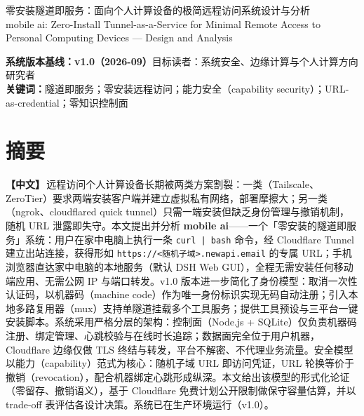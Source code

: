 \documentclass[10pt,a4paper]{article}
\newcommand{\sys}{mobile ai}
\begin{document}
\begin{center}
{\LARGE 零安装隧道即服务：面向个人计算设备的极简远程访问系统设计与分析\\[0.6em]}
{\large mobile ai: Zero-Install Tunnel-as-a-Service for Minimal Remote Access to Personal Computing Devices --- Design and Analysis}
\end{center}

\vspace{0.8em}
\noindent\textbf{系统版本基线：v1.0（2026-09）}\quad 目标读者：系统安全、边缘计算与个人计算方向研究者\\
\noindent\textbf{关键词：}隧道即服务；零安装远程访问；能力安全（capability security）；URL-as-credential；零知识控制面

\section*{摘要}

\noindent\textbf{【中文】}\,远程访问个人计算设备长期被两类方案割裂：一类（Tailscale、ZeroTier）要求两端安装客户端并建立虚拟私有网络，部署摩擦大；另一类（ngrok、cloudflared quick tunnel）只需一端安装但缺乏身份管理与撤销机制，随机 URL 泄露即失守。本文提出并分析 \textbf{\sys}——一个「零安装的隧道即服务」系统：用户在家中电脑上执行一条 \texttt{curl\ | bash} 命令，经 Cloudflare Tunnel 建立出站连接，获得形如 \texttt{https://<随机子域>.newapi.email} 的专属 URL；手机浏览器直达家中电脑的本地服务（默认 DSH Web GUI），全程无需安装任何移动端应用、无需公网 IP 与端口转发。v1.0 版本进一步简化了身份模型：取消一次性认证码，以机器码（machine code）作为唯一身份标识实现无码自动注册；引入本地多路复用器（mux）支持单隧道挂载多个工具服务；提供工具预设与三平台一键安装脚本。系统采用严格分层的架构：控制面（Node.js + SQLite）仅负责机器码注册、绑定管理、心跳校验与在线时长追踪；数据面完全位于用户机器，Cloudflare 边缘仅做 TLS 终结与转发，平台不解密、不代理业务流量。安全模型以能力（capability）范式为核心：随机子域 URL 即访问凭证，URL 轮换等价于撤销（revocation），配合机器绑定心跳形成纵深。本文给出该模型的形式化论证（零留存、撤销语义），基于 Cloudflare 免费计划公开限制做保守容量估算，并以 trade-off 表评估各设计决策。系统已在生产环境运行（v1.0）。
\end{document}

